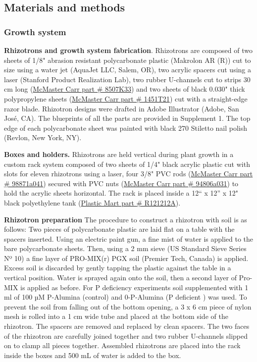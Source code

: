 \documentclass[]{article}
\begin{document}
\subsection{Materials and methods}\label{materials-and-methods}

\subsubsection{Growth system}\label{growth-system}

\textbf{Rhizotrons and growth system fabrication}. Rhizotrons are
composed of two sheets of 1/8" abrasion resistant polycarbonate plastic
(Makrolon AR (R)) cut to size using a water jet (AquaJet LLC, Salem,
OR), two acrylic spacers cut using a laser (Stanford Product Realization
Lab), two rubber U-channels cut to strips 30 cm long
(\href{http://www.mcmaster.com/\#catalog/121/3838/=wdre76}{McMaster Carr
part \# 8507K33}) and two sheets of black 0.030" thick polypropylene
sheets
(\href{http://www.mcmaster.com/\#catalog/121/3616/=wdrfie}{McMaster Carr
part \# 1451T21}) cut with a straight-edge razor blade. Rhizotron
designs were drafted in Adobe Illustrator (Adobe, San José, CA). The
blueprints of all the parts are provided in Supplement 1. The top edge
of each polycarbonate sheet was painted with black 270 Stiletto nail
polish (Revlon, New York, NY).

\textbf{Boxes and holders.} Rhizotrons are held vertical during plant
growth in a custom rack system composed of two sheets of 1/4" black
acrylic plastic cut with slots for eleven rhizotrons using a laser, four
3/8" PVC rods
(\href{http://www.mcmaster.com/\#98871a041/=wdrftz}{McMaster Carr part
\# 98871a041}) secured with PVC nuts
(\href{http://www.mcmaster.com/\#94806a031/=wdrgar}{McMaster Carr part
\# 94806a031}) to hold the acrylic sheets horizontal. The rack is placed
inside a 12`` x 12'' x 12" black polyethylene tank
(\href{http://www.plastic-mart.com/product/4510/7-gallon-rectangular-tank-r121212a}{Plastic
Mart part \# R121212A}).

\textbf{Rhizotron preparation} The procedure to construct a rhizotron
with soil is as follows: Two pieces of polycarbonate plastic are laid
flat on a table with the spacers inserted. Using an electric paint gun,
a fine mist of water is applied to the bare polycarbonate sheets. Then,
using a 2 mm sieve (US Standard Sieve Series Nº 10) a fine layer of
PRO-MIX(r) PGX soil (Premier Tech, Canada) is applied. Excess soil is
discarded by gently tapping the plastic against the table in a vertical
position. Water is sprayed again onto the soil, then a second layer of
Pro-MIX is applied as before. For P deficiency experiments soil
supplemented with 1 ml of 100 µM P-Alumina (control) and 0-P-Alumina (P
deficient ) was used. To prevent the soil from falling out of the bottom
opening, a 3 x 6 cm piece of nylon mesh is rolled into a 1 cm wide tube
and placed at the bottom side of the rhizotron. The spacers are removed
and replaced by clean spacers. The two faces of the rhizotron are
carefully joined together and two rubber U-channels slipped on to clamp
all pieces together. Assembled rhizotrons are placed into the rack
inside the boxes and 500 mL of water is added to the box.
\end{document}
